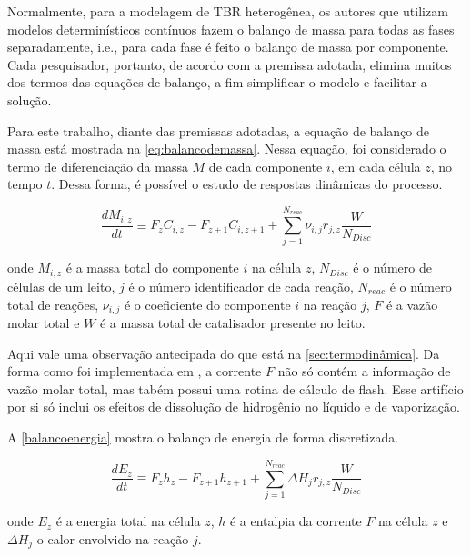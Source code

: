 Normalmente, para a modelagem de TBR heterogênea, os autores que utilizam
modelos determinísticos contínuos fazem o balanço de massa para todas as
fases separadamente, i.e., para cada fase é feito o balanço de massa por componente. 
Cada pesquisador, portanto, de acordo com a premissa adotada, elimina muitos dos
termos das equações de balanço, a fim simplificar o modelo e facilitar a
solução. 

Para este trabalho, diante das premissas adotadas, a equação de balanço de massa está mostrada na \autoref{eq:balancodemassa}. Nessa equação, foi considerado o termo de diferenciação da massa $M$ de cada componente $i$, em cada célula $z$, no tempo $t$. Dessa forma, é possível o estudo de respostas dinâmicas do processo.

\begin{equation}
\dfrac{dM_{i,z}}{dt} \equiv F_zC_{i,z} - F_{z+1}C_{i,z+1} + \displaystyle\sum_{j=1}^{N_{reac}}
\nu_{i,j}r_{j,z} \dfrac{W}{N_{Disc}}
\label{eq:balancodemassa}
\end{equation}

onde $M_{i,z}$ é a massa total do componente $i$ na célula $z$, $N_{Disc}$ é o número de células de um leito, $j$ é o número identificador de cada reação, $N_{reac}$ é o número total de reações, $\nu_{i,j}$ é o coeficiente do componente $i$ na reação $j$, $F$ é a vazão molar total e $W$ é a massa total de catalisador presente no leito.

Aqui vale uma observação antecipada do que está na \autoref{sec:termodinâmica}. Da forma como foi implementada em \emso, a corrente $F$ não só contém a informação de vazão molar total, mas tabém possui uma rotina de cálculo de flash. Esse artifício por si só inclui os efeitos de dissolução de hidrogênio no líquido e de vaporização.

A \autoref{balancoenergia} mostra o balanço de energia de forma discretizada.

\begin{equation}
\dfrac{dE_{z}}{dt} \equiv F_zh_{z} - F_{z+1}h_{z+1} + \displaystyle\sum_{j=1}^{N_{reac}}
\Delta H_{j}r_{j,z} \dfrac{W}{N_{Disc}}
\label{eq:balancodeenergia}
\end{equation}

onde $E_{z}$ é a energia total na célula $z$,  $h$ é a entalpia da corrente $F$ na célula $z$ e $\Delta H_{j}$ o calor envolvido na reação $j$.

